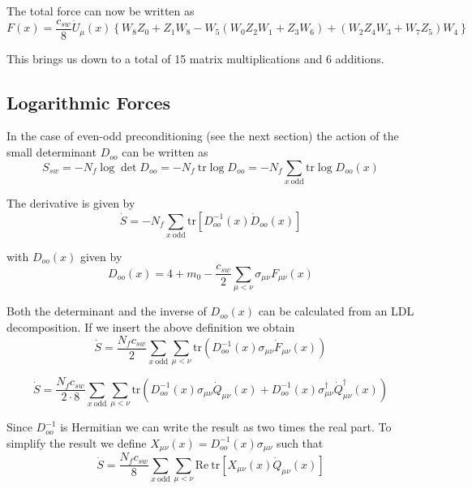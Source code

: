 \documentclass[12pt]{article}
\newcommand{\tr}{\mathrm{tr}}
\newcommand{\re}{\mathrm{Re}}
\begin{document}
The total force can now be written as
\begin{equation}
 F(x) = \frac{c_{sw}}{8}\dot{U}_\mu(x)\left\{W_8Z_0 + Z_1W_8 - W_5(W_0Z_2W_1+Z_3W_6) + (W_2Z_4W_3+W_7Z_5)W_4\right\}
\end{equation}

This brings us down to a total of 15 matrix multiplications and 6 additions.

\subsection*{Logarithmic Forces}
In the case of even-odd preconditioning (see the next section) the action of the small determinant $D_{oo}$ can be written as
\begin{equation}
 S_{sw} = -N_f\log\det D_{oo} = -N_f~\tr\log D_{oo} = -N_f\sum_{x~\mathrm{odd}}\tr\log D_{oo}(x)
\end{equation}

The derivative is given by
\begin{equation}
 \dot{S} = -N_f\sum_{x~\mathrm{odd}}\tr\left[D_{oo}^{-1}(x)\dot{D}_{oo}(x)\right]
\end{equation}

with $D_{oo}(x)$ given by
\begin{equation}
 D_{oo}(x) = 4+m_0-\frac{c_{sw}}{2}\sum_{\mu<\nu}\sigma_{\mu\nu}F_{\mu\nu}(x)
\end{equation}

Both the determinant and the inverse of $D_{oo}(x)$ can be calculated from an LDL decomposition. If we insert the above definition we obtain
\begin{equation}
 \dot{S} = \frac{N_fc_{sw}}{2}\sum_{x~\mathrm{odd}}\sum_{\mu<\nu}\tr(D_{oo}^{-1}(x)\sigma_{\mu\nu}\dot{F}_{\mu\nu}(x))
\end{equation}

\begin{equation}
 \dot{S} = \frac{N_fc_{sw}}{2\cdot8}\sum_{x~\mathrm{odd}}\sum_{\mu<\nu}
 \tr(D_{oo}^{-1}(x)\sigma_{\mu\nu}\dot{Q}_{\mu\nu}(x) + D_{oo}^{-1}(x)\sigma_{\mu\nu}^\dagger\dot{Q}_{\mu\nu}^\dagger(x))
\end{equation}

Since $D_{oo}^{-1}$ is Hermitian we can write the result as two times the real part. To simplify the result we define $X_{\mu\nu}(x)=D_{oo}^{-1}(x)\sigma_{\mu\nu}$ such that
\begin{equation}
 \dot{S} = \frac{N_fc_{sw}}{8}\sum_{x~\mathrm{odd}}\sum_{\mu<\nu}\re~\tr[X_{\mu\nu}(x)\dot{Q}_{\mu\nu}(x)]
\end{equation}
\end{document}
